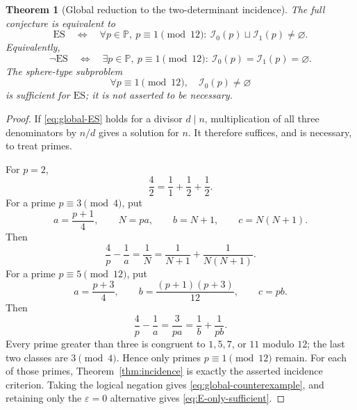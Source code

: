 \documentclass[11pt]{article}
\newtheorem{theorem}{Theorem}[section]
\theoremstyle{definition}
\theoremstyle{remark}
\begin{document}
\begin{theorem}[Global reduction to the two-determinant incidence]
\label{thm:global-incidence}
The full conjecture is equivalent to
\begin{equation}\label{eq:global-incidence}
 \boxed{
 \mathrm{ES}
 \quad\Longleftrightarrow\quad
 \forall p\in\mathbb P,
 \ p\equiv1\pmod{12}:
 \ \mathscr I_0(p)\sqcup\mathscr I_1(p)\ne\varnothing.}
\end{equation}
Equivalently,
\begin{equation}\label{eq:global-counterexample}
 \neg\mathrm{ES}
 \quad\Longleftrightarrow\quad
 \exists p\in\mathbb P,
 \ p\equiv1\pmod{12}:
 \ \mathscr I_0(p)=\mathscr I_1(p)=\varnothing.
\end{equation}
The sphere-type subproblem
\begin{equation}\label{eq:E-only-sufficient}
 \forall p\equiv1\pmod{12},\quad
 \mathscr I_0(p)\ne\varnothing
\end{equation}
is sufficient for \(\mathrm{ES}\); it is not asserted to be necessary.
\end{theorem}

\begin{proof}
If \eqref{eq:global-ES} holds for a divisor \(d\mid n\), multiplication of all
three denominators by \(n/d\) gives a solution for \(n\).  It therefore
suffices, and is necessary, to treat primes.

For \(p=2\),
\[
 \frac42=\frac11+\frac12+\frac12.
\]
For a prime \(p\equiv3\pmod4\), put
\[
 a=\frac{p+1}{4},\qquad N=pa,\qquad
 b=N+1,\qquad c=N(N+1).
\]
Then
\[
 \frac4p-\frac1a=\frac1N
 =\frac1{N+1}+\frac1{N(N+1)}.
\]
For a prime \(p\equiv5\pmod{12}\), put
\[
 a=\frac{p+3}{4},\qquad
 b=\frac{(p+1)(p+3)}{12},\qquad c=pb.
\]
Then
\[
 \frac4p-\frac1a=\frac3{pa}
 =\frac1b+\frac1{pb}.
\]
Every prime greater than three is congruent to \(1,5,7\), or \(11\) modulo
\(12\); the last two classes are \(3\pmod4\).  Hence only primes
\(p\equiv1\pmod{12}\) remain.  For each of those primes,
Theorem~\ref{thm:incidence} is exactly the asserted incidence criterion.
Taking the logical negation gives \eqref{eq:global-counterexample}, and
retaining only the \(\varepsilon=0\) alternative gives
\eqref{eq:E-only-sufficient}.
\end{proof}
\end{document}
